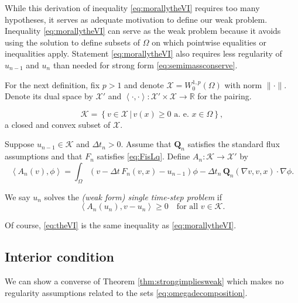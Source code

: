 \documentclass[final,leqno,onefignum,onetabnum]{siamltex1213bueler}
\newcommand\bQ{\mathbf{Q}}
\renewcommand{\grad}{\nabla}
\newcommand{\ip}[2]{\ensuremath{\left<#1,#2\right>}}
\newcommand\RR{\mathbb{R}}
\begin{document}
While this derivation of inequality \eqref{eq:morallytheVI} requires too many hypotheses, it serves as adequate motivation to define our weak problem.  Inequality \eqref{eq:morallytheVI} can serve as the weak problem because it avoids using the solution to define subsets of $\Omega$ on which pointwise equalities or inequalities apply.  Statement \eqref{eq:morallytheVI} also requires less regularity of $u_{n-1}$ and $u_n$ than needed for strong form \eqref{eq:semimassconserve}.

For the next definition, fix $p>1$ and denote $\mathcal{X} = W_0^{1,p}(\Omega)$ with norm $\|\cdot\|$.  Denote its dual space by $\mathcal{X}'$ and $\ip{\cdot}{\cdot}: \mathcal{X}' \times \mathcal{X} \to \RR$ for the pairing.

\begin{definition}  \label{def:spaces}
    $$\mathcal{K} = \left\{v \in \mathcal{X} \,\big|\, v(x) \ge 0 \text{ a.~e.~} x \in \Omega\right\},$$
a closed and convex subset of $\mathcal{X}$.
\end{definition}

\begin{definition}  Suppose $u_{n-1}\in\mathcal{K}$ and $\Delta t_n>0$.  Assume that $\bQ_n$ satisfies the standard flux assumptions and that $F_n$ satisfies \eqref{eq:FisLq}.  Define $A_n:\mathcal{K} \to \mathcal{X}'$ by
\begin{equation}
  \ip{A_n(v)}{\phi} = \int_\Omega \left(v - \Delta t\, F_n(v,x) - u_{n-1}\right)\phi - \Delta t_n\, \bQ_n(\grad v,v,x) \cdot \grad\phi. \label{eq:defineAn}
\end{equation}
\end{definition}

\begin{definition}  We say $u_n$ solves the \emph{(weak form) single time-step problem} if
\begin{equation}
  \ip{A_n(u_n)}{v-u_n} \ge 0 \quad \text{for all } v \in \mathcal{K}.  \label{eq:theVI}
\end{equation}
\end{definition}

Of course, \eqref{eq:theVI} is the same inequality as \eqref{eq:morallytheVI}.

\subsection{Interior condition}  \label{subsec:interior}  We can show a converse of Theorem \ref{thm:strongimpliesweak} which makes no regularity assumptions related to the sets \eqref{eq:omegadecomposition}.
\end{document}
